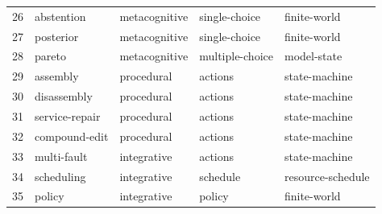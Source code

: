 \begin{center}
\begin{tabular}{rllll}
26 & abstention & metacognitive & single-choice & finite-world \\
27 & posterior & metacognitive & single-choice & finite-world \\
28 & pareto & metacognitive & multiple-choice & model-state \\
29 & assembly & procedural & actions & state-machine \\
30 & disassembly & procedural & actions & state-machine \\
31 & service-repair & procedural & actions & state-machine \\
32 & compound-edit & procedural & actions & state-machine \\
33 & multi-fault & integrative & actions & state-machine \\
34 & scheduling & integrative & schedule & resource-schedule \\
35 & policy & integrative & policy & finite-world \\
\bottomrule\end{tabular}\end{center}
\clearpage
